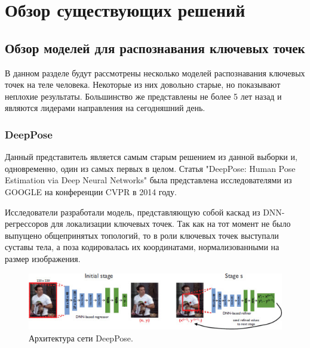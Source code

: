 \section{Обзор существующих решений}
\label{sec:Chapter4} 



\subsection{Обзор моделей для распознавания ключевых точек}
\label{sec:Chapter4_PE}

В данном разделе будут рассмотрены несколько моделей распознавания ключевых точек на теле человека. Некоторые из них довольно старые, но показывают неплохие результаты. Большинство же представлены не более 5 лет назад и являются лидерами направления на сегодняшний день.

\subsubsection*{DeepPose}

Данный представитель является самым старым решением из данной выборки и, одновременно, один из самых первых в целом. Статья "DeepPose: Human Pose Estimation via Deep Neural Networks"   \cite{DeepPose} была представлена исследователями из GOOGLE на конференции CVPR в 2014 году.

Исследователи разработали модель, представляющую собой каскад из DNN-регрессоров для локализации ключевых точек. Так как на тот момент не было выпущено общепринятых топологий, то в роли ключевых точек выступали суставы тела, а поза кодировалась их координатами, нормализованными на размер изображения.

\begin{figure}[h]
	\centering
	\includegraphics[width=\textwidth]{./images/review/DeepPose}
	\caption{Архитектура сети DeepPose. \cite{DeepPose}}
	\label{fig:dp_architecture}
\end{figure}

